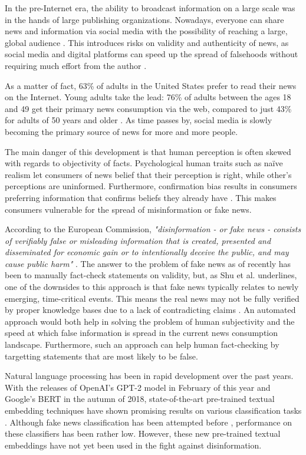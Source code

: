 In the pre-Internet era, the ability to broadcast information on a large scale was in the hands of large publishing organizations. 
Nowadays, everyone can share news and information via social media with the possibility of reaching a large, global audience \cite{howell2013}. 
This introduces risks on validity and authenticity of news, as social media and digital platforms can speed up the spread of falsehoods without requiring much effort from the author \cite{europeancommission2018}. 

As a matter of fact, 63\% of adults in the United States prefer to read their news on the Internet. 
Young adults take the lead: 76\% of adults between the ages 18 and 49 get their primary news consumption via the web, compared to just 43\% for adults of 50 years and older \cite{mitchell2018}.
As time passes by, social media is slowly becoming the primary source of news for more and more people. 

The main danger of this development is that human perception is often skewed with regards to objectivity of facts. 
Psychological human traits such as naïve realism let consumers of news belief that their perception is right, while other's perceptions are uninformed. 
Furthermore, confirmation bias results in consumers preferring information that confirms beliefs they already have \cite{shu2017}. 
This makes consumers vulnerable for the spread of misinformation or fake news. 

According to the European Commission, \textit{"disinformation - or fake news - consists of verifiably false or misleading information that is created, presented and disseminated for economic gain or to intentionally deceive the public, and may cause public harm"} \cite{europeancommission2018}. 
The answer to the problem of fake news as of recently has been to manually fact-check statements on validity, but, as Shu et al. underlines, one of the downsides to this approach is that fake news typically relates to newly emerging, time-critical events. 
This means the real news may not be fully verified by proper knowledge bases due to a lack of contradicting claims \cite{shu2017}. 
An automated approach would both help in solving the problem of human subjectivity and the speed at which false information is spread in the current news consumption landscape.
Furthermore, such an approach can help human fact-checking by targetting statements that are most likely to be false.

Natural language processing has been in rapid development over the past years. 
With the releases of OpenAI's GPT-2 model in February of this year and Google's BERT in the autumn of 2018, state-of-the-art pre-trained textual embedding techniques have shown promising results on various classification tasks \cite{radford2019}\cite{devlin2018}. 
Although fake news classification has been attempted before \cite{wang2018}\cite{khurana2017}, performance on these classifiers has been rather low. 
However, these new pre-trained textual embeddings have not yet been used in the fight against disinformation. 

